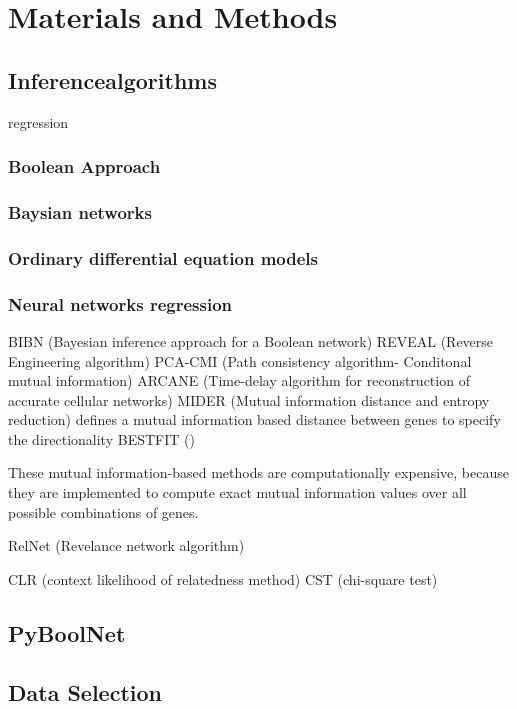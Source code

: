 \chapter{Materials and Methods}
\section{Inferencealgorithms}
regression
\citep{CHAI201455}
\subsection*{Boolean Approach}
\subsection*{Baysian networks}
\subsection*{Ordinary differential equation models}
\subsection*{Neural networks regression}
BIBN (Bayesian inference approach for a Boolean network)
REVEAL (Reverse Engineering algorithm)
PCA-CMI (Path consistency algorithm- Conditonal mutual information)
ARCANE (Time-delay algorithm for reconstruction of accurate cellular networks)
MIDER (Mutual information distance and entropy reduction)\citep{MIDER}
	defines a mutual information based distance between genes to specify the directionality
BESTFIT ()

These mutual information-based methods are computationally expensive, because they are implemented to compute exact mutual information values over all possible combinations of genes.

RelNet (Revelance network algorithm)

CLR (context likelihood of relatedness method)
CST (chi-square test)

\section{PyBoolNet}



\section{Data Selection}
